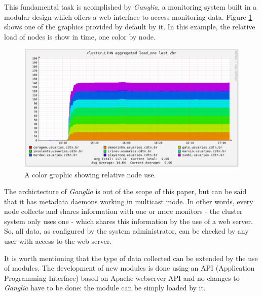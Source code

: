 \documentclass[twoside,a4paper,12pt,english]{inac19}
\begin{document}
This fundamental task is acomplished by \textit{Ganglia}\cite{ganglia}, a monitoring system built in
a modular design which offers a web interface to access monitoring data. Figure \ref{fig:ganglia-rainbow} shows
one of the graphics provided by default by it. In this example, the relative load of nodes is show in time,
one color by node.

\begin{figure}[th] %
  \centering\includegraphics[scale=0.55]{images/ganglia_rainbow.png}
  \caption{A color graphic showing relative node use.}
  \label{fig:ganglia-rainbow}
\end{figure}

The archictecture of \textit{Ganglia} is out of the scope of this paper, but can be said that it has metadata
daemons working in multicast mode. In other words, every node collects and shares information with one or
more monitors - the cluster system only uses one - which shares this information by the use of a web server.
So, all data, as configured by the system administrator, can be checked by any user with access to the
web server.

It is worth mentioning that the type of data collected can be extended by the use of modules. The development
of new modules is done using an API (Application Programming Interface) based on Apache webserver API\cite{apache}
and no changes to \textit{Ganglia} have to be done: the module can be simply loaded by it.

\end{document}

